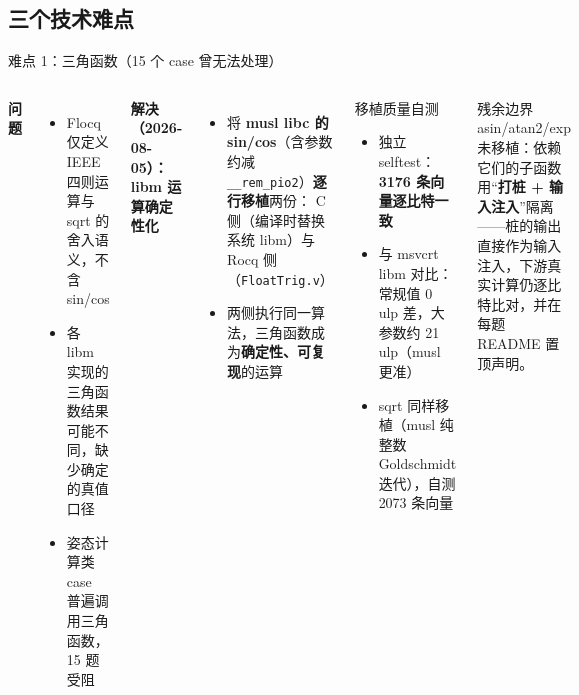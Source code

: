 \documentclass[UTF8,aspectratio=169]{ctexbeamer}
\begin{document}
\subsection{三个技术难点}
\begin{frame}{难点 1：三角函数（15 个 case 曾无法处理）}
  \begin{columns}[T]
    \textbf{问题}
    \begin{itemize}\small
      \item Flocq 仅定义 IEEE 四则运算与 sqrt 的舍入语义，不含 sin/cos
      \item 各 libm 实现的三角函数结果可能不同，缺少确定的真值口径
      \item 姿态计算类 case 普遍调用三角函数，15 题受阻
    \end{itemize}
    \textbf{解决（2026-08-05）：libm 运算确定性化}
    \begin{itemize}\small
      \item 将 \textbf{musl libc 的 sin/cos}（含参数约减 \texttt{\_\_rem\_pio2}）\textbf{逐行移植}两份：
        C 侧（编译时替换系统 libm）与 Rocq 侧（\texttt{FloatTrig.v}）
      \item 两侧执行同一算法，三角函数成为\textbf{确定性、可复现}的运算
    \end{itemize}
    \begin{block}{移植质量自测}
      \small
      \begin{itemize}
        \item 独立 selftest：\textbf{3176 条向量逐比特一致}
        \item 与 msvcrt libm 对比：常规值 0 ulp 差，大参数约 21 ulp（musl 更准）
        \item sqrt 同样移植（musl 纯整数 Goldschmidt 迭代），自测 2073 条向量
      \end{itemize}
    \end{block}
    \begin{block}{残余边界}
      \small asin/atan2/exp 未移植：依赖它们的子函数用``\textbf{打桩 + 输入注入}''隔离——桩的输出直接作为输入注入，下游真实计算仍逐比特比对，并在每题 README 置顶声明。
    \end{block}
  \end{columns}
\end{frame}
\end{document}
